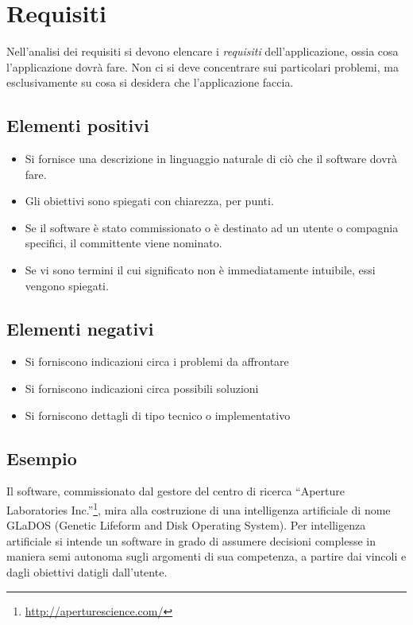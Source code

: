 \documentclass[a4paper,12pt]{report}
\begin{document}
\section{Requisiti}

Nell'analisi dei requisiti si devono elencare i \emph{requisiti} dell'applicazione, ossia cosa l'applicazione dovrà fare.
%
Non ci si deve concentrare sui particolari problemi, ma esclusivamente su cosa si desidera che l'applicazione faccia.

\subsection*{Elementi positivi}
\begin{itemize}
	\item Si fornisce una descrizione in linguaggio naturale di ciò che il software dovrà fare.
	\item Gli obiettivi sono spiegati con chiarezza, per punti.
	\item Se il software è stato commissionato o è destinato ad un utente o compagnia specifici, il committente viene nominato.
	\item Se vi sono termini il cui significato non è immediatamente intuibile, essi vengono spiegati.
\end{itemize}

\subsection*{Elementi negativi}
\begin{itemize}
	\item Si forniscono indicazioni circa i problemi da affrontare
	\item Si forniscono indicazioni circa possibili soluzioni
	\item Si forniscono dettagli di tipo tecnico o implementativo
\end{itemize}

\subsection*{Esempio}
Il software, commissionato dal gestore del centro di ricerca ``Aperture Laboratories Inc.''\footnote{\url{http://aperturescience.com/}}, mira alla costruzione di una intelligenza artificiale di nome GLaDOS (Genetic Lifeform and Disk Operating System).
%
Per intelligenza artificiale si intende un software in grado di assumere decisioni complesse in maniera semi autonoma sugli argomenti di sua competenza, a partire dai vincoli e dagli obiettivi datigli dall'utente.
\end{document}
